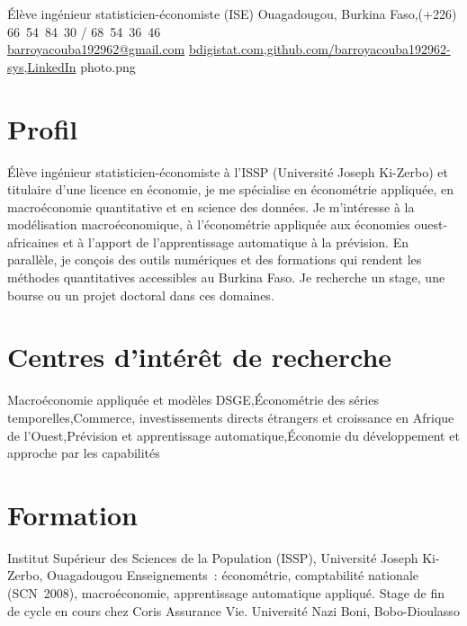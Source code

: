\documentclass[10pt]{article}
\begin{document}
  {Élève ingénieur statisticien-économiste (ISE)}
  {Ouagadougou, Burkina Faso\sep (+226) 66~54~84~30 / 68~54~36~46\\[1pt]\href{mailto:barroyacouba192962@gmail.com}{barroyacouba192962@gmail.com}}
  {\href{https://bdigistat.com}{bdigistat.com}\sep \href{https://github.com/barroyacouba192962-sys}{github.com/barroyacouba192962-sys}\sep \href{https://www.linkedin.com/in/barro-undefined-b30b47340/}{LinkedIn}}
  {photo.png}

\section{Profil}
Élève ingénieur statisticien-économiste à l'ISSP (Université Joseph Ki-Zerbo) et titulaire d'une licence en économie,
je me spécialise en économétrie appliquée, en macroéconomie quantitative et en science des données. Je m'intéresse à la modélisation macroéconomique, à l'économétrie appliquée aux économies ouest-africaines et à
l'apport de l'apprentissage automatique à la prévision. En parallèle, je conçois des outils numériques et des formations
qui rendent les méthodes quantitatives accessibles au Burkina Faso. Je recherche un stage, une bourse ou un projet
doctoral dans ces domaines.

\section{Centres d’intérêt de recherche}
Macroéconomie appliquée et modèles DSGE\sep Économétrie des séries temporelles\sep Commerce, investissements
directs étrangers et croissance en Afrique de l'Ouest\sep Prévision et apprentissage automatique\sep Économie du
développement et approche par les capabilités

\section{Formation}
  {Institut Supérieur des Sciences de la Population (ISSP), Université Joseph Ki-Zerbo, Ouagadougou}
  {Enseignements~: économétrie, comptabilité nationale (SCN~2008), macroéconomie, apprentissage automatique appliqué.
   Stage de fin de cycle en cours chez Coris Assurance Vie.}
  {Université Nazi Boni, Bobo-Dioulasso}{}
\end{document}
